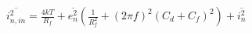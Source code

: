 \documentclass[preview, border=8pt, 12pt]{standalone}
\begin{document}
$\displaystyle 
\overline{i_{n,in}^2} = \frac{4kT}{R_f} + \overline{e_n^2}\!\left(\frac{1}{R_f^2} + (2\pi f)^2(C_d+C_f)^2\right)\! + \overline{i_n^2}
$
\end{document}
